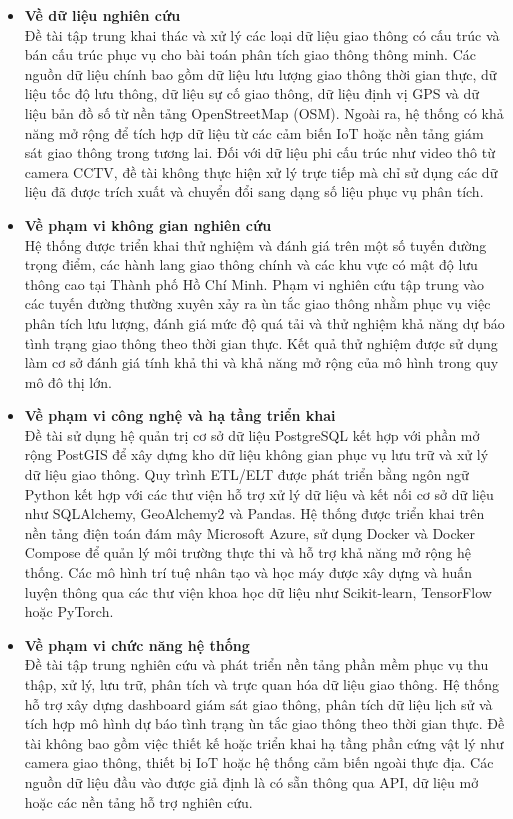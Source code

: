 \begin{itemize}

    \item \textbf{Về dữ liệu nghiên cứu}\\
    Đề tài tập trung khai thác và xử lý các loại dữ liệu giao thông có cấu trúc và bán cấu trúc phục vụ cho bài toán phân tích giao thông thông minh. Các nguồn dữ liệu chính bao gồm dữ liệu lưu lượng giao thông thời gian thực, dữ liệu tốc độ lưu thông, dữ liệu sự cố giao thông, dữ liệu định vị GPS và dữ liệu bản đồ số từ nền tảng OpenStreetMap (OSM). Ngoài ra, hệ thống có khả năng mở rộng để tích hợp dữ liệu từ các cảm biến IoT hoặc nền tảng giám sát giao thông trong tương lai. Đối với dữ liệu phi cấu trúc như video thô từ camera CCTV, đề tài không thực hiện xử lý trực tiếp mà chỉ sử dụng các dữ liệu đã được trích xuất và chuyển đổi sang dạng số liệu phục vụ phân tích.

    \item \textbf{Về phạm vi không gian nghiên cứu}\\
    Hệ thống được triển khai thử nghiệm và đánh giá trên một số tuyến đường trọng điểm, các hành lang giao thông chính và các khu vực có mật độ lưu thông cao tại Thành phố Hồ Chí Minh. Phạm vi nghiên cứu tập trung vào các tuyến đường thường xuyên xảy ra ùn tắc giao thông nhằm phục vụ việc phân tích lưu lượng, đánh giá mức độ quá tải và thử nghiệm khả năng dự báo tình trạng giao thông theo thời gian thực. Kết quả thử nghiệm được sử dụng làm cơ sở đánh giá tính khả thi và khả năng mở rộng của mô hình trong quy mô đô thị lớn.

    \item \textbf{Về phạm vi công nghệ và hạ tầng triển khai}\\
    Đề tài sử dụng hệ quản trị cơ sở dữ liệu PostgreSQL kết hợp với phần mở rộng PostGIS để xây dựng kho dữ liệu không gian phục vụ lưu trữ và xử lý dữ liệu giao thông. Quy trình ETL/ELT được phát triển bằng ngôn ngữ Python kết hợp với các thư viện hỗ trợ xử lý dữ liệu và kết nối cơ sở dữ liệu như SQLAlchemy, GeoAlchemy2 và Pandas. Hệ thống được triển khai trên nền tảng điện toán đám mây Microsoft Azure, sử dụng Docker và Docker Compose để quản lý môi trường thực thi và hỗ trợ khả năng mở rộng hệ thống. Các mô hình trí tuệ nhân tạo và học máy được xây dựng và huấn luyện thông qua các thư viện khoa học dữ liệu như Scikit-learn, TensorFlow hoặc PyTorch.

    \item \textbf{Về phạm vi chức năng hệ thống}\\
    Đề tài tập trung nghiên cứu và phát triển nền tảng phần mềm phục vụ thu thập, xử lý, lưu trữ, phân tích và trực quan hóa dữ liệu giao thông. Hệ thống hỗ trợ xây dựng dashboard giám sát giao thông, phân tích dữ liệu lịch sử và tích hợp mô hình dự báo tình trạng ùn tắc giao thông theo thời gian thực. Đề tài không bao gồm việc thiết kế hoặc triển khai hạ tầng phần cứng vật lý như camera giao thông, thiết bị IoT hoặc hệ thống cảm biến ngoài thực địa. Các nguồn dữ liệu đầu vào được giả định là có sẵn thông qua API, dữ liệu mở hoặc các nền tảng hỗ trợ nghiên cứu.


\end{itemize}
